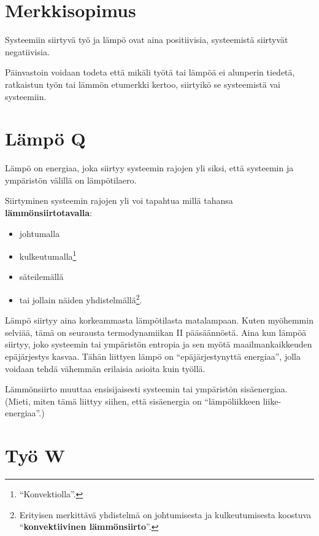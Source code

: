 \documentclass[12pt,a4paper,finnish]{book}
\begin{document}
\section{Merkkisopimus} \label{sec:merkkisopimus} %

Systeemiin siirtyvä työ ja lämpö ovat aina positiivisia, systeemistä siirtyvät negatiivisia.

Päinvastoin voidaan todeta että mikäli työtä tai lämpöä ei alunperin tiedetä, ratkaistun 
työn tai lämmön etumerkki kertoo, siirtyikö se systeemistä vai systeemiin.

\section{Lämpö Q} %

Lämpö on energiaa, joka siirtyy systeemin rajojen yli siksi, että systeemin ja ympäristön 
välillä on lämpötilaero. 

Siirtyminen systeemin rajojen yli voi tapahtua millä tahansa \textbf{lämmönsiirtotavalla}:

\begin{itemize}
 \item johtumalla
 \item kulkeutumalla\footnote{``Konvektiolla''.}
 \item säteilemällä
 \item tai jollain näiden 
yhdistelmällä\footnote{Erityisen merkittävä yhdistelmä on johtumisesta ja kulkeutumisesta 
koostuva ``\textbf{konvektiivinen lämmönsiirto}''.}.
\end{itemize}

Lämpö siirtyy aina korkeammasta lämpötilasta matalampaan. Kuten myöhemmin selviää, tämä 
on seurausta termodynamiikan II pääsäännöstä. Aina kun lämpöä siirtyy, joko systeemin tai 
ympäristön entropia ja sen myötä maailmankaikkeuden epäjärjestys kasvaa.
Tähän liittyen lämpö on ``epäjärjestynyttä energiaa'', jolla voidaan tehdä vähemmän 
erilaisia asioita kuin työllä.

Lämmönsiirto muuttaa ensisijaisesti systeemin tai ympäristön sisäenergiaa. (Mieti, 
miten tämä liittyy siihen, että sisäenergia on ``lämpöliikkeen liike-energiaa''.)

\section{Työ W} %
\end{document}

